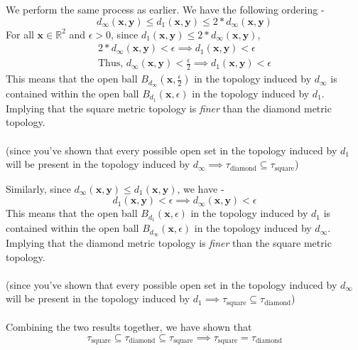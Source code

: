 \begin{frame}
    We perform the same process as earlier. We have the following ordering -
    \begin{equation*}
        d_\infty(\boldsymbol{x}, \boldsymbol{y}) \leq d_1(\boldsymbol{x}, \boldsymbol{y}) \leq 2*d_\infty(\boldsymbol{x}, \boldsymbol{y})
    \end{equation*}
    For all $\boldsymbol{x} \in \mathbb{R}^2$ and $\epsilon > 0$, since $d_1(\boldsymbol{x}, \boldsymbol{y}) \leq 2*d_\infty(\boldsymbol{x}, \boldsymbol{y})$,
    \begin{gather*}
         2*d_\infty(\boldsymbol{x}, \boldsymbol{y}) < \epsilon \implies d_1(\boldsymbol{x}, \boldsymbol{y}) < \epsilon \\
         \text{Thus, }d_\infty(\boldsymbol{x}, \boldsymbol{y}) < \frac{\epsilon}{2} \implies d_1(\boldsymbol{x}, \boldsymbol{y}) < \epsilon
    \end{gather*}
    This means that the open ball $B_{d_\infty}\left(\boldsymbol{x}, \frac{\epsilon}{2}\right)$ in the topology induced by $d_{\infty}$ is contained within the open ball $B_{d_1}\left(\boldsymbol{x}, \epsilon\right)$ in the topology induced by $d_1$. Implying that the square metric topology is \textit{finer} than the diamond metric topology. \\\\
    (since you've shown that every possible open set in the topology induced by $d_1$ will be present in the topology induced by $d_\infty \implies \tau_{\text{diamond}} \subseteq \tau_{\text{square}}$)
\end{frame}

\begin{frame}
    Similarly, since $d_\infty(\boldsymbol{x}, \boldsymbol{y}) \leq d_1(\boldsymbol{x}, \boldsymbol{y})$, we have -
    \begin{equation*}
        d_1(\boldsymbol{x}, \boldsymbol{y}) < \epsilon \implies d_\infty(\boldsymbol{x}, \boldsymbol{y}) < \epsilon
    \end{equation*}
    This means that the open ball $B_{d_1}\left(\boldsymbol{x}, \epsilon\right)$ in the topology induced by $d_1$ is contained within the open ball $B_{d_\infty}\left(\boldsymbol{x}, \epsilon\right)$ in the topology induced by $d_\infty$. Implying that the diamond metric topology is \textit{finer} than the square metric topology. \\\\
    (since you've shown that every possible open set in the topology induced by $d_\infty$ will be present in the topology induced by $d_1 \implies \tau_{\text{square}} \subseteq \tau_{\text{diamond}}$) \\\\
    Combining the two results together, we have shown that 
    \begin{equation*}
        \tau_{\text{square}} \subseteq \tau_{\text{diamond}} \subseteq \tau_{\text{square}} \implies \tau_{\text{square}} = \tau_{\text{diamond}}
    \end{equation*}
\end{frame}

